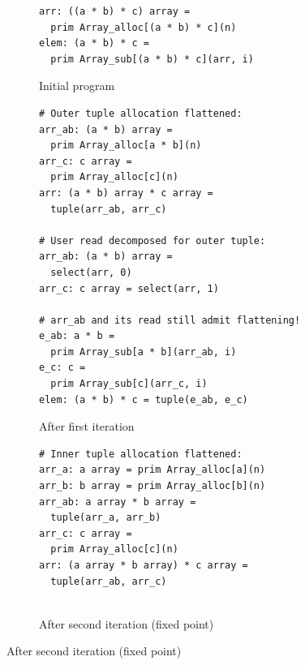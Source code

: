 \begin{figure}[htbp]
  \centering
  \begin{minipage}[t]{0.48\textwidth}
    \vspace{0pt}
    \begin{subfigure}[t]{\linewidth}
      \caption{Initial program}
      \label{fig:shallow_repeated_initial}
      \vspace{1mm}
\begin{verbatim}
arr: ((a * b) * c) array =
  prim Array_alloc[(a * b) * c](n)
elem: (a * b) * c =
  prim Array_sub[(a * b) * c](arr, i)
\end{verbatim}
    \end{subfigure}

    \vspace{2mm}
    \begin{subfigure}[t]{\linewidth}
      \caption{After first iteration}
      \label{fig:shallow_repeated_first}
      \vspace{1mm}
\begin{verbatim}
# Outer tuple allocation flattened:
arr_ab: (a * b) array =
  prim Array_alloc[a * b](n)
arr_c: c array =
  prim Array_alloc[c](n)
arr: (a * b) array * c array =
  tuple(arr_ab, arr_c)

# User read decomposed for outer tuple:
arr_ab: (a * b) array =
  select(arr, 0)
arr_c: c array = select(arr, 1)

# arr_ab and its read still admit flattening!
e_ab: a * b =
  prim Array_sub[a * b](arr_ab, i)
e_c: c =
  prim Array_sub[c](arr_c, i)
elem: (a * b) * c = tuple(e_ab, e_c)
\end{verbatim}
    \end{subfigure}
  \end{minipage}\hfill
  \begin{minipage}[t]{0.48\textwidth}
    \vspace{0pt}
    \begin{subfigure}[t]{\linewidth}
      \caption{After second iteration (fixed point)}
      \label{fig:shallow_repeated_second}
      \vspace{1mm}
\begin{verbatim}
# Inner tuple allocation flattened:
arr_a: a array = prim Array_alloc[a](n)
arr_b: b array = prim Array_alloc[b](n)
arr_ab: a array * b array =
  tuple(arr_a, arr_b)
arr_c: c array =
  prim Array_alloc[c](n)
arr: (a array * b array) * c array =
  tuple(arr_ab, arr_c)


\end{verbatim}
\end{subfigure}
\end{minipage}
\end{figure}
